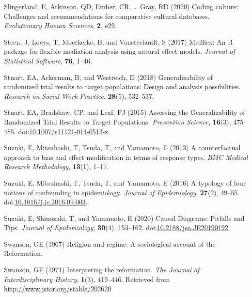 \documentclass[
  singlecolumn]{article}
\newlength{\cslhangindent}
\newenvironment{CSLReferences}[2] %
 {\begin{list}{}{%
  \setlength{\itemindent}{0pt}
  \setlength{\leftmargin}{0pt}
  \setlength{\parsep}{0pt}
  \ifodd #1
   \setlength{\leftmargin}{\cslhangindent}
   \setlength{\itemindent}{-1\cslhangindent}
  \fi
  \setlength{\itemsep}{#2\baselineskip}}}
 {\end{list}}
\begin{document}
\begin{CSLReferences}{1}{0}
Slingerland, E, Atkinson, QD, Ember, CR, \ldots{} Gray, RD (2020) Coding
culture: Challenges and recommendations for comparative cultural
databases. \emph{Evolutionary Human Sciences}, \textbf{2}, e29.

Steen, J, Loeys, T, Moerkerke, B, and Vansteelandt, S (2017) Medflex: An
{R} package for flexible mediation analysis using natural effect models.
\emph{Journal of Statistical Software}, \textbf{76}, 1--46.

Stuart, EA, Ackerman, B, and Westreich, D (2018) Generalizability of
randomized trial results to target populations: Design and analysis
possibilities. \emph{Research on Social Work Practice}, \textbf{28}(5),
532--537.

Stuart, EA, Bradshaw, CP, and Leaf, PJ (2015) Assessing the
Generalizability of Randomized Trial Results to Target Populations.
\emph{Prevention Science}, \textbf{16}(3), 475--485.
doi:\href{https://doi.org/10.1007/s11121-014-0513-z}{10.1007/s11121-014-0513-z}.

Suzuki, E, Mitsuhashi, T, Tsuda, T, and Yamamoto, E (2013) A
counterfactual approach to bias and effect modification in terms of
response types. \emph{BMC Medical Research Methodology}, \textbf{13}(1),
1--17.

Suzuki, E, Mitsuhashi, T, Tsuda, T, and Yamamoto, E (2016) A typology of
four notions of confounding in epidemiology. \emph{Journal of
Epidemiology}, \textbf{27}(2), 49--55.
doi:\href{https://doi.org/10.1016/j.je.2016.09.003}{10.1016/j.je.2016.09.003}.

Suzuki, E, Shinozaki, T, and Yamamoto, E (2020) Causal Diagrams:
Pitfalls and Tips. \emph{Journal of Epidemiology}, \textbf{30}(4),
153--162.
doi:\href{https://doi.org/10.2188/jea.JE20190192}{10.2188/jea.JE20190192}.

Swanson, GE (1967) Religion and regime: A sociological account of the
{R}eformation.

Swanson, GE (1971) Interpreting the reformation. \emph{The Journal of
Interdisciplinary History}, \textbf{1}(3), 419--446. Retrieved from
\url{http://www.jstor.org/stable/202620}


\end{CSLReferences}
\end{document}
